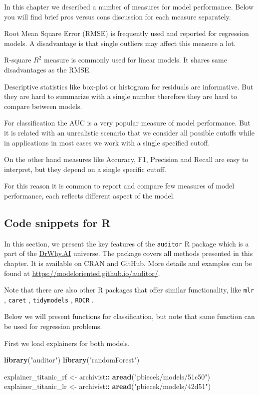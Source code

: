 \documentclass[12pt,]{krantz}
\newenvironment{Shaded}{\begin{snugshade}}{\end{snugshade}}
\newcommand{\KeywordTok}[1]{\textcolor[rgb]{0.13,0.29,0.53}{\textbf{#1}}}
\newcommand{\NormalTok}[1]{#1}
\newcommand{\OperatorTok}[1]{\textcolor[rgb]{0.81,0.36,0.00}{\textbf{#1}}}
\newcommand{\StringTok}[1]{\textcolor[rgb]{0.31,0.60,0.02}{#1}}
\begin{document}
In this chapter we described a number of measures for model performance. Below you will find brief pros versus cons discussion for each measure separately.

Root Mean Square Error (RMSE) is frequently used and reported for regression models. A disadvantage is that single outliers may affect this measure a lot.

R-square \(R^2\) measure is commonly used for linear models. It shares same disadvantages as the RMSE.

Descriptive statistics like box-plot or histogram for residuals are informative. But they are hard to summarize with a single number therefore they are hard to compare between models.

For classification the AUC is a very popular measure of model performance. But it is related with an unrealistic scenario that we consider all possible cutoffs while in applications in most cases we work with a single specified cutoff.

On the other hand measures like Accuracy, F1, Precision and Recall are easy to interpret, but they depend on a single specific cutoff.

For this reason it is common to report and compare few measures of model performance, each reflects different aspect of the model.

\hypertarget{modelPerformanceR}{%
\subsection{Code snippets for R}\label{modelPerformanceR}}

In this section, we present the key features of the \texttt{auditor} R package \citep{auditor} which is a part of the \href{http://DrWhy.AI}{DrWhy.AI} universe. The package covers all methods presented in this chapter. It is available on CRAN and GitHub. More details and examples can be found at \url{https://modeloriented.github.io/auditor/}.

Note that there are also other R packages that offer similar functionality, like \texttt{mlr} \citep{mlr}, \texttt{caret} \citep{caret}, \texttt{tidymodels} \citep{tidymodels}, \texttt{ROCR} \citep{ROCR}.

Below we will present functions for classification, but note that same function can be used for regression problems.

First we load explainers for both models.

\begin{Shaded}
\begin{Highlighting}[]
\KeywordTok{library}\NormalTok{(}\StringTok{"auditor"}\NormalTok{)}
\KeywordTok{library}\NormalTok{(}\StringTok{"randomForest"}\NormalTok{)}

\NormalTok{explainer_titanic_rf <-}\StringTok{ }\NormalTok{archivist}\OperatorTok{::}\StringTok{ }\KeywordTok{aread}\NormalTok{(}\StringTok{"pbiecek/models/51c50"}\NormalTok{)}
\NormalTok{explainer_titanic_lr <-}\StringTok{ }\NormalTok{archivist}\OperatorTok{::}\StringTok{ }\KeywordTok{aread}\NormalTok{(}\StringTok{"pbiecek/models/42d51"}\NormalTok{)}
\end{Highlighting}
\end{Shaded}
\end{document}
